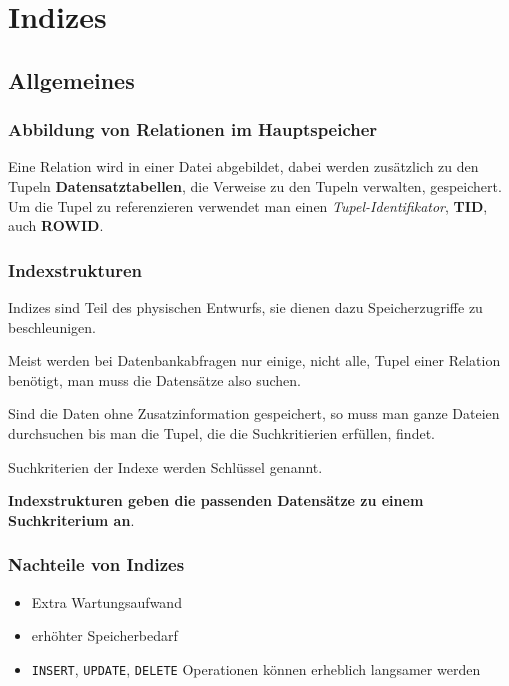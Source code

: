 \chapter{Indizes}\label{cha:indices}

\section{Allgemeines}

\subsection{Abbildung von Relationen im Hauptspeicher}

Eine Relation wird in einer Datei abgebildet, dabei werden zusätzlich zu den Tupeln \textbf{Datensatztabellen}, die Verweise zu den Tupeln verwalten, gespeichert. Um die Tupel zu referenzieren verwendet man einen \textit{Tupel-Identifikator}, \textbf{TID}, auch \textbf{ROWID}.

\subsection{Indexstrukturen}

Indizes sind Teil des physischen Entwurfs, sie dienen dazu Speicherzugriffe zu beschleunigen.

Meist werden bei Datenbankabfragen nur einige, nicht alle, Tupel einer Relation benötigt, man muss die Datensätze also suchen.

Sind die Daten ohne Zusatzinformation gespeichert, so muss man ganze Dateien durchsuchen bis man die Tupel, die die Suchkritierien erfüllen, findet.

Suchkriterien der Indexe werden Schlüssel genannt.

\textbf{Indexstrukturen geben die passenden Datensätze zu einem Suchkriterium an}.

\subsection{Nachteile von Indizes}

\begin{itemize}
    \item Extra Wartungsaufwand
    \item erhöhter Speicherbedarf
    \item \lstinline{INSERT}, \lstinline{UPDATE}, \lstinline{DELETE} Operationen können erheblich langsamer werden
\end{itemize}

